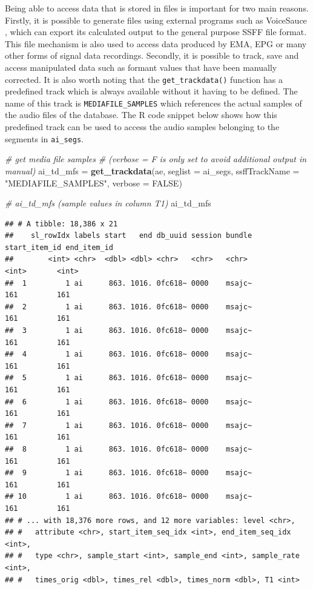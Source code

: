 \documentclass[]{book}
\newenvironment{Shaded}{\begin{snugshade}}{\end{snugshade}}
\newcommand{\CommentTok}[1]{\textcolor[rgb]{0.56,0.35,0.01}{\textit{#1}}}
\newcommand{\DataTypeTok}[1]{\textcolor[rgb]{0.13,0.29,0.53}{#1}}
\newcommand{\KeywordTok}[1]{\textcolor[rgb]{0.13,0.29,0.53}{\textbf{#1}}}
\newcommand{\NormalTok}[1]{#1}
\newcommand{\OtherTok}[1]{\textcolor[rgb]{0.56,0.35,0.01}{#1}}
\newcommand{\StringTok}[1]{\textcolor[rgb]{0.31,0.60,0.02}{#1}}
\begin{document}
Being able to access data that is stored in files is important for two main reasons. Firstly, it is possible to generate files using external programs such as VoiceSauce \citep{shue:2011a}, which can export its calculated output to the general purpose SSFF file format. This file mechanism is also used to access data produced by EMA, EPG or many other forms of signal data recordings. Secondly, it is possible to track, save and access manipulated data such as formant values that have been manually corrected. It is also worth noting that the \texttt{get\_trackdata()} function has a predefined track which is always available without it having to be defined. The name of this track is \texttt{MEDIAFILE\_SAMPLES} which references the actual samples of the audio files of the database. The R code snippet below shows how this predefined track can be used to access the audio samples belonging to the segments in \texttt{ai\_segs}.

\begin{Shaded}
\begin{Highlighting}[]
\CommentTok{# get media file samples}
\CommentTok{# (verbose = F is only set to avoid additional output in manual)}
\NormalTok{ai_td_mfs =}\StringTok{ }\KeywordTok{get_trackdata}\NormalTok{(ae,}
                          \DataTypeTok{seglist =}\NormalTok{ ai_segs,}
                          \DataTypeTok{ssffTrackName =} \StringTok{"MEDIAFILE_SAMPLES"}\NormalTok{,}
                          \DataTypeTok{verbose =} \OtherTok{FALSE}\NormalTok{)}

\CommentTok{# ai_td_mfs (sample values in column T1)}
\NormalTok{ai_td_mfs}
\end{Highlighting}
\end{Shaded}

\begin{verbatim}
## # A tibble: 18,386 x 21
##    sl_rowIdx labels start   end db_uuid session bundle start_item_id end_item_id
##        <int> <chr>  <dbl> <dbl> <chr>   <chr>   <chr>          <int>       <int>
##  1         1 ai      863. 1016. 0fc618~ 0000    msajc~           161         161
##  2         1 ai      863. 1016. 0fc618~ 0000    msajc~           161         161
##  3         1 ai      863. 1016. 0fc618~ 0000    msajc~           161         161
##  4         1 ai      863. 1016. 0fc618~ 0000    msajc~           161         161
##  5         1 ai      863. 1016. 0fc618~ 0000    msajc~           161         161
##  6         1 ai      863. 1016. 0fc618~ 0000    msajc~           161         161
##  7         1 ai      863. 1016. 0fc618~ 0000    msajc~           161         161
##  8         1 ai      863. 1016. 0fc618~ 0000    msajc~           161         161
##  9         1 ai      863. 1016. 0fc618~ 0000    msajc~           161         161
## 10         1 ai      863. 1016. 0fc618~ 0000    msajc~           161         161
## # ... with 18,376 more rows, and 12 more variables: level <chr>,
## #   attribute <chr>, start_item_seq_idx <int>, end_item_seq_idx <int>,
## #   type <chr>, sample_start <int>, sample_end <int>, sample_rate <int>,
## #   times_orig <dbl>, times_rel <dbl>, times_norm <dbl>, T1 <int>
\end{verbatim}
\end{document}
